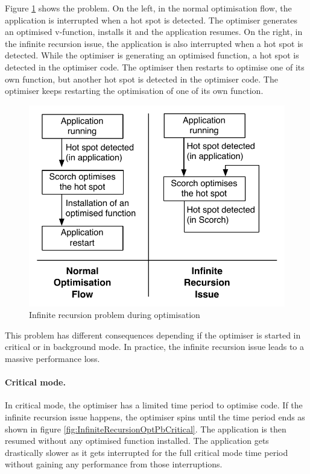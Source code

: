 \documentclass[a4paper,12pt,twoside]{../includes/ThesisStyle}
\begin{document}
Figure \ref{fig:InfiniteRecursionOptPb} shows the problem. On the left, in the normal optimisation flow, the application is interrupted when a hot spot is detected. The optimiser generates an optimised v-function, installs it and the application resumes. On the right, in the infinite recursion issue, the application is also interrupted when a hot spot is detected. While the optimiser is generating an optimised function, a hot spot is detected in the optimiser code. The optimiser then restarts to optimise one of its own function, but another hot spot is detected in the optimiser code. The optimiser keeps restarting the optimisation of one of its own function.

\begin{figure}[h!]
    \begin{center}
        \includegraphics[width=0.65\linewidth]{InfiniteRecursionOptPb}
        \caption{Infinite recursion problem during optimisation}
        \label{fig:InfiniteRecursionOptPb}
    \end{center}
\end{figure}

This problem has different consequences depending if the optimiser is started in critical or in background mode. In practice, the infinite recursion issue leads to a massive performance loss.

\paragraph{Critical mode.} In critical mode, the optimiser has a limited time period to optimise code. If the infinite recursion issue happens, the optimiser spins until the time period ends as shown in figure \ref{fig:InfiniteRecursionOptPbCritical}. The application is then resumed without any optimised function installed. The application gets drastically slower as it gets interrupted for the full critical mode time period without gaining any performance from those interruptions.
\end{document}
